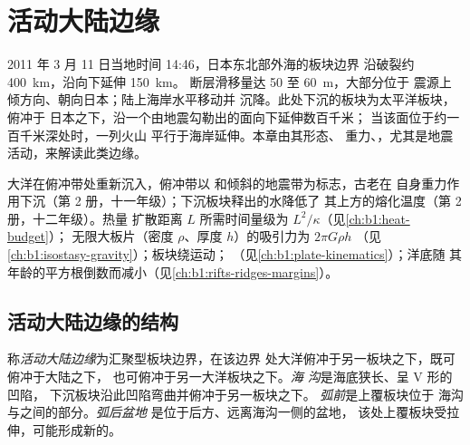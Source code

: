 \chapter{活动大陆边缘}\label{ch:b1:active-margins}

2011 年 3 月 11 日当地时间 14:46，日本东北部外海的板块边界
沿破裂约 \qty{400}{km}，沿向下延伸 \qty{150}{km}。
断层滑移量达 50 至 \qty{60}{m}，大部分位于
震源上倾方向、朝向日本；陆上海岸水平移动并
沉降。此处下沉的板块为太平洋板块，俯冲于
日本之下，沿一个由地震勾勒出的面向下延伸数百千米；
当该面位于约一百千米深处时，一列火山
平行于海岸延伸。本章由其形态、
重力、，尤其是地震活动，来解读此类边缘。

\begin{recall}
大洋在俯冲带处重新沉入，俯冲带以
和倾斜的地震带为标志，古老在
自身重力作用下沉（第 2 册，十一年级）；下沉板块释出的水降低了
其上方的熔化温度（第 2 册，十二年级）。热量
扩散距离 $L$ 所需时间量级为 $L^2/\kappa$（见\cref{ch:b1:heat-budget}）；
无限大板片（密度 $\rho$、厚度 $h$）的吸引力为 $2\pi G\rho h$
（见\cref{ch:b1:isostasy-gravity}）；板块绕运动；
（见\cref{ch:b1:plate-kinematics}）；洋底随
其年龄的平方根倒数而减小（见\cref{ch:b1:rifts-ridges-margins}）。
\end{recall}

\section{活动大陆边缘的结构}\label{sec:b1:active-margins:anatomy}

\begin{definition}\label{def:b1:active-margins:active-margin}
称\emph{活动大陆边缘}为汇聚型板块边界，在该边界
处大洋俯冲于另一板块之下，既可俯冲于大陆之下，
也可俯冲于另一大洋板块之下。\emph{海
沟}是海底狭长、呈 V 形的凹陷，
下沉板块沿此凹陷弯曲并俯冲于另一板块之下。
\emph{弧前}是上覆板块位于
海沟与之间的部分。\emph{弧后盆地}
是位于后方、远离海沟一侧的盆地，
该处上覆板块受拉伸，可能形成新的。
\end{definition}

